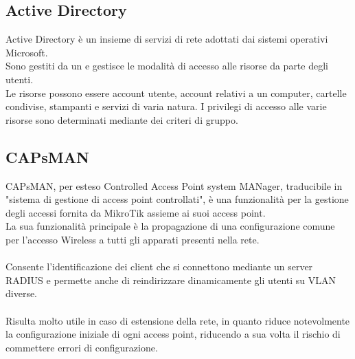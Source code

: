 \documentclass[Tesi.tex]{subfiles}
\begin{document}
\subsection{Active Directory}
Active Directory è un insieme di servizi di rete adottati dai sistemi operativi Microsoft. \\
Sono gestiti da un  e gestisce le modalità di accesso alle risorse da parte degli utenti. \\
Le risorse possono essere account utente, account relativi a un computer, cartelle condivise, stampanti e servizi di varia natura. I privilegi di accesso alle varie risorse sono determinati mediante dei criteri di gruppo.

\subsection{CAPsMAN}
CAPsMAN, per esteso Controlled Access Point system MANager, traducibile in "sistema di gestione di access point controllati", è una funzionalità per la gestione degli accessi fornita da MikroTik assieme ai suoi access point. \\
La sua funzionalità principale è la propagazione di una configurazione comune per l'accesso Wireless a tutti gli apparati presenti nella rete. \\\\
Consente l'identificazione dei client che si connettono mediante un server RADIUS e permette anche di reindirizzare dinamicamente gli utenti su VLAN diverse. \\\\
Risulta molto utile in caso di estensione della rete, in quanto riduce notevolmente la configurazione iniziale di ogni access point, riducendo a sua volta il rischio di commettere errori di configurazione.
\end{document}
